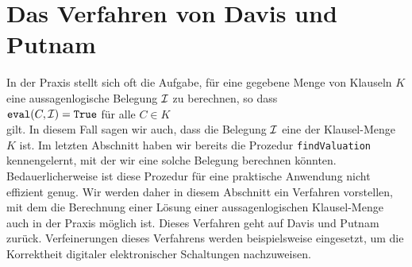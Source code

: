 \section{Das Verfahren von Davis und Putnam}
In der Praxis stellt sich oft die Aufgabe, für eine gegebene Menge von Klauseln $K$ eine aussagenlogische
Belegung $\mathcal{I}$ zu berechnen, so dass 
\\[0.2cm]
\hspace*{1.3cm} $\texttt{eval}(C,\mathcal{I}) = \texttt{True}$ \quad für alle $C\in K$ \\[0.2cm]
gilt.  In diesem Fall sagen wir auch, dass die Belegung $\mathcal{I}$ eine  der
 Klausel-Menge $K$ ist.  Im letzten Abschnitt haben wir bereits die Prozedur \texttt{findValuation}
 kennengelernt, mit der wir eine solche Belegung berechnen könnten.
Bedauerlicherweise ist diese Prozedur für eine praktische Anwendung nicht effizient genug.
Wir werden daher in diesem Abschnitt ein Verfahren vorstellen, mit dem die Berechnung einer Lösung
einer aussagenlogischen Klausel-Menge auch in der Praxis möglich ist.
Dieses Verfahren geht auf Davis und Putnam
\cite{davis:1960, davis:1962} zurück.  Verfeinerungen dieses Verfahrens werden beispielsweise
eingesetzt, um die Korrektheit digitaler elektronischer Schaltungen nachzuweisen.  

